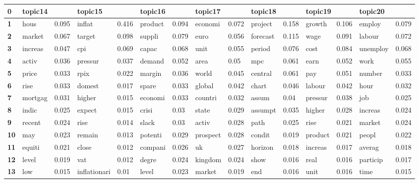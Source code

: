 \begin{tabular}{|l|l|l||l|l||l|l||l|l||l|l||l|l||l|l||}
\toprule
\textbf{0} & \multicolumn{2}{l}{topic14} & \multicolumn{2}{l}{topic15} & \multicolumn{2}{l}{topic16} & \multicolumn{2}{l}{topic17} & \multicolumn{2}{l}{topic18} & \multicolumn{2}{l}{topic19} & \multicolumn{2}{l}{topic20} \\
\midrule
\textbf{1 } &  hous &  0.095 &  inflat &  0.416 &  product &  0.094 &  economi &  0.072 &  project &  0.158 &  growth &  0.106 &  employ &  0.079 \\
\textbf{2 } &  market &  0.067 &  target &  0.098 &  suppli &  0.079 &  euro &  0.056 &  forecast &  0.115 &  wage &  0.091 &  labour &  0.072 \\
\textbf{3 } &  increas &  0.047 &  cpi &  0.069 &  capac &  0.068 &  unit &  0.055 &  period &  0.076 &  cost &  0.084 &  unemploy &  0.068 \\
\textbf{4 } &  activ &  0.036 &  pressur &  0.037 &  demand &  0.052 &  area &  0.05 &  mpc &  0.061 &  earn &  0.052 &  work &  0.055 \\
\textbf{5 } &  price &  0.033 &  rpix &  0.022 &  margin &  0.036 &  world &  0.045 &  central &  0.061 &  pay &  0.051 &  number &  0.033 \\
\textbf{6 } &  rise &  0.033 &  domest &  0.017 &  spare &  0.033 &  global &  0.042 &  chart &  0.046 &  labour &  0.042 &  hour &  0.032 \\
\textbf{7 } &  mortgag &  0.031 &  higher &  0.015 &  economi &  0.033 &  countri &  0.032 &  assum &  0.04 &  pressur &  0.038 &  job &  0.025 \\
\textbf{8 } &  indic &  0.025 &  expect &  0.015 &  crisi &  0.03 &  state &  0.029 &  assumpt &  0.035 &  higher &  0.028 &  increas &  0.024 \\
\textbf{9 } &  recent &  0.024 &  rise &  0.014 &  slack &  0.03 &  activ &  0.028 &  path &  0.025 &  rise &  0.021 &  market &  0.024 \\
\textbf{10} &  may &  0.023 &  remain &  0.013 &  potenti &  0.029 &  prospect &  0.028 &  condit &  0.019 &  product &  0.021 &  peopl &  0.022 \\
\textbf{11} &  equiti &  0.021 &  close &  0.012 &  compani &  0.026 &  uk &  0.027 &  horizon &  0.018 &  increas &  0.017 &  averag &  0.018 \\
\textbf{12} &  level &  0.019 &  vat &  0.012 &  degre &  0.024 &  kingdom &  0.024 &  show &  0.016 &  real &  0.016 &  particip &  0.017 \\
\textbf{13} &  low &  0.015 &  inflationari &  0.01 &  level &  0.023 &  market &  0.019 &  end &  0.016 &  unit &  0.016 &  time &  0.015 \\

\end{tabular}
